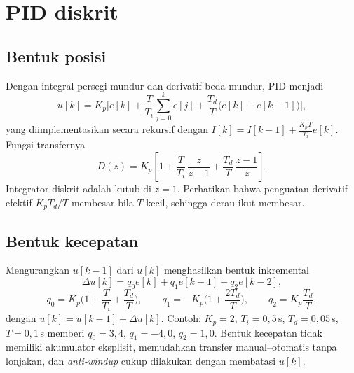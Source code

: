 \section{PID diskrit}
\subsection{Bentuk posisi}
Dengan integral persegi mundur dan derivatif beda mundur, PID menjadi
\begin{equation}
	u[k] = K_p\Big[e[k] + \frac{T}{T_i}\sum_{j=0}^{k}e[j] + \frac{T_d}{T}\big(e[k]-e[k-1]\big)\Big],
\end{equation}
yang diimplementasikan secara rekursif dengan $I[k] = I[k-1] + \frac{K_pT}{T_i}e[k]$. Fungsi transfernya
\begin{equation}
	D(z) = K_p\left[1 + \frac{T}{T_i}\,\frac{z}{z-1} + \frac{T_d}{T}\,\frac{z-1}{z}\right].
\end{equation}
Integrator diskrit adalah kutub di $z = 1$. Perhatikan bahwa penguatan derivatif efektif $K_pT_d/T$ membesar bila $T$ kecil, sehingga derau ikut membesar.

\subsection{Bentuk kecepatan}
Mengurangkan $u[k-1]$ dari $u[k]$ menghasilkan bentuk inkremental
\begin{equation}
	\Delta u[k] = q_0e[k] + q_1e[k-1] + q_2e[k-2],
\end{equation}
\begin{equation}
	q_0 = K_p\Big(1 + \frac{T}{T_i} + \frac{T_d}{T}\Big),\qquad q_1 = -K_p\Big(1 + \frac{2T_d}{T}\Big),\qquad q_2 = K_p\frac{T_d}{T},
\end{equation}
dengan $u[k] = u[k-1] + \Delta u[k]$. Contoh: $K_p = 2$, $T_i = 0{,}5$\,s, $T_d = 0{,}05$\,s, $T = 0{,}1$\,s memberi $q_0 = 3{,}4$, $q_1 = -4{,}0$, $q_2 = 1{,}0$. Bentuk kecepatan tidak memiliki akumulator eksplisit, memudahkan transfer manual--otomatis tanpa lonjakan, dan \textit{anti-windup} cukup dilakukan dengan membatasi $u[k]$.


